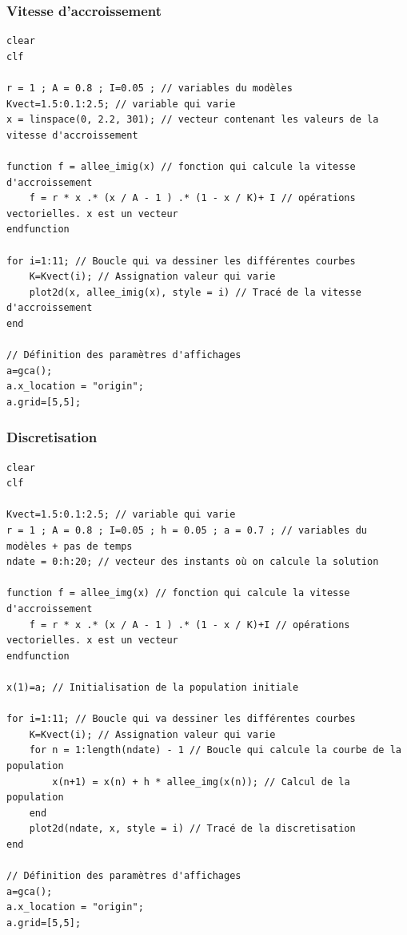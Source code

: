 \documentclass{article}
\begin{document}
\subsubsection{Vitesse d'accroissement}

\begin{verbatim}
clear
clf

r = 1 ; A = 0.8 ; I=0.05 ; // variables du modèles
Kvect=1.5:0.1:2.5; // variable qui varie
x = linspace(0, 2.2, 301); // vecteur contenant les valeurs de la vitesse d'accroissement

function f = allee_imig(x) // fonction qui calcule la vitesse d'accroissement
    f = r * x .* (x / A - 1 ) .* (1 - x / K)+ I // opérations vectorielles. x est un vecteur
endfunction

for i=1:11; // Boucle qui va dessiner les différentes courbes
    K=Kvect(i); // Assignation valeur qui varie
    plot2d(x, allee_imig(x), style = i) // Tracé de la vitesse d'accroissement
end

// Définition des paramètres d'affichages
a=gca();
a.x_location = "origin";
a.grid=[5,5];
\end{verbatim}

\subsubsection{Discretisation}

\begin{verbatim}
clear
clf

Kvect=1.5:0.1:2.5; // variable qui varie
r = 1 ; A = 0.8 ; I=0.05 ; h = 0.05 ; a = 0.7 ; // variables du modèles + pas de temps
ndate = 0:h:20; // vecteur des instants où on calcule la solution

function f = allee_img(x) // fonction qui calcule la vitesse d'accroissement
    f = r * x .* (x / A - 1 ) .* (1 - x / K)+I // opérations vectorielles. x est un vecteur
endfunction

x(1)=a; // Initialisation de la population initiale

for i=1:11; // Boucle qui va dessiner les différentes courbes
    K=Kvect(i); // Assignation valeur qui varie
    for n = 1:length(ndate) - 1 // Boucle qui calcule la courbe de la population
        x(n+1) = x(n) + h * allee_img(x(n)); // Calcul de la population
    end 
    plot2d(ndate, x, style = i) // Tracé de la discretisation
end

// Définition des paramètres d'affichages
a=gca();
a.x_location = "origin";
a.grid=[5,5];
\end{verbatim}
\end{document}
